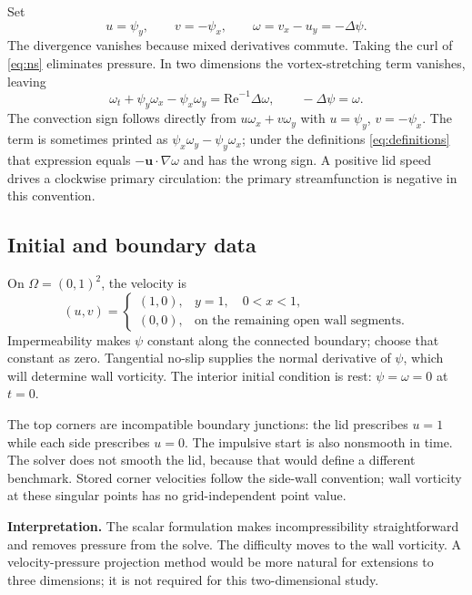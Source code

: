 \documentclass[11pt,a4paper]{article}
\newcommand{\Rey}{\mathrm{Re}}
\newcommand{\takeaway}[1]{\par\smallskip\noindent\colorbox{teal!7}{\parbox{\dimexpr\linewidth-2\fboxsep}{\textbf{\color{teal}Interpretation.} #1}}\par\smallskip}
\begin{document}
Set
\begin{equation}
u=\psi_y,\qquad v=-\psi_x,\qquad
\omega=v_x-u_y=-\Delta\psi.\label{eq:definitions}
\end{equation}
The divergence vanishes because mixed derivatives commute. Taking the curl of
\eqref{eq:ns} eliminates pressure. In two dimensions the vortex-stretching term
vanishes, leaving
\begin{equation}
\boxed{\omega_t+\psi_y\omega_x-\psi_x\omega_y
=\Rey^{-1}\Delta\omega,\qquad -\Delta\psi=\omega.}\label{eq:transport}
\end{equation}
The convection sign follows directly from $u\omega_x+v\omega_y$ with
$u=\psi_y$, $v=-\psi_x$. The term is sometimes printed as
$\psi_x\omega_y-\psi_y\omega_x$; under the definitions \eqref{eq:definitions}
that expression equals $-\mathbf{u}\cdot\nabla\omega$ and has the wrong sign.
A positive lid speed drives a clockwise primary circulation: the primary
streamfunction is negative in this convention.

\subsection{Initial and boundary data}
On $\Omega=(0,1)^2$, the velocity is
\begin{equation}
(u,v)=\begin{cases}(1,0),&y=1,\quad 0<x<1,\\
(0,0),&\text{on the remaining open wall segments.}\end{cases}
\end{equation}
Impermeability makes $\psi$ constant along the connected boundary; choose that
constant as zero. Tangential no-slip supplies the normal derivative of $\psi$,
which will determine wall vorticity. The interior initial condition is rest:
$\psi=\omega=0$ at $t=0$.

The top corners are incompatible boundary junctions: the lid prescribes
$u=1$ while each side prescribes $u=0$. The impulsive start is also nonsmooth in
time. The solver does not smooth the lid, because that would define a different
benchmark. Stored corner velocities follow the side-wall convention; wall
vorticity at these singular points has no grid-independent point value.

\takeaway{The scalar formulation makes incompressibility straightforward and
removes pressure from the solve. The difficulty moves to the wall vorticity.
A velocity-pressure projection method would be more natural for extensions to
three dimensions; it is not required for this two-dimensional study.}
\end{document}
